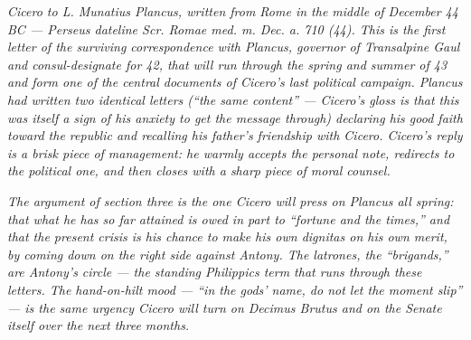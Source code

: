 
\textit{Cicero to L. Munatius Plancus, written from Rome in
the middle of December 44 BC --- Perseus dateline
\textit{Scr. Romae med. m. Dec. a. 710 (44)}. This is the
first letter of the surviving correspondence with Plancus,
governor of Transalpine Gaul and consul-designate for 42,
that will run through the spring and summer of 43 and form
one of the central documents of Cicero's last political
campaign. Plancus had written two identical letters
(``the same content'' --- Cicero's gloss is that this was
itself a sign of his anxiety to get the message through)
declaring his good faith toward the republic and recalling
his father's friendship with Cicero. Cicero's reply is a
brisk piece of management: he warmly accepts the personal
note, redirects to the political one, and then closes with
a sharp piece of moral counsel.}

\textit{The argument of section three is the one Cicero
will press on Plancus all spring: that what he has so far
attained is owed in part to ``fortune and the times,'' and
that the present crisis is his chance to make his own
\textit{dignitas} on his own merit, by coming down on the
right side against Antony. The \textit{latrones}, the
``brigands,'' are Antony's circle --- the standing
\textit{Philippics} term that runs through these letters.
The hand-on-hilt mood --- ``in the gods' name, do not let
the moment slip'' --- is the same urgency Cicero will turn
on Decimus Brutus and on the Senate itself over the next
three months.}
